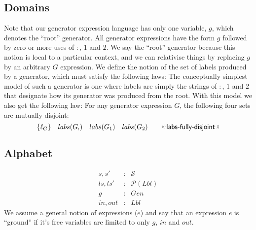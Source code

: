 \subsection{Domains}
Note that our generator expression language has only one variable, $g$,
which denotes the ``root'' generator.
All generator expressions have the form $g$ followed by zero
or more uses of $:$, $1$ and $2$.
We say the  ``root'' generator because this notion is local to a
particular context, and we can relativise things by replacing $g$
by an arbitrary $G$ expression.
We define the notion of the set of labels produced by a generator,
which must satisfy the following laws:
The conceptually simplest model of such a generator
is one where labels are simply the strings of $:$, $1$ and $2$
that designate how its generator was produced from the root.
With this model we also get the following law:
For any generator expression $G$,
the following four sets are mutually disjoint:
\[
  \setof{\ell_G}
  \quad
  labs(G_{:})
  \quad
  labs(G_1)
  \quad
  labs(G_2)
  \qquad
  \elabel{labs-fully-disjoint}
\]

\subsection{Alphabet}

\begin{eqnarray*}
   s, s' &:& \mathcal S
\\ ls, ls' &:& \mathcal P (Lbl)
\\ g &:& Gen
\\ in, out &:& Lbl
\end{eqnarray*}
We assume a general notion of expressions ($e$)
and say that an expression $e$ is ``ground''
if it's free variables are limited to only $g$, $in$ and $out$.

